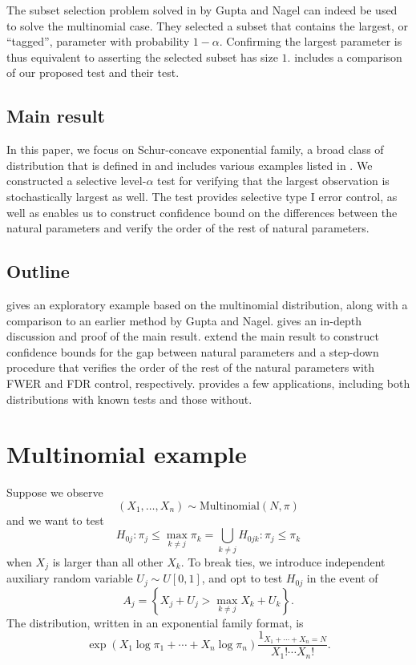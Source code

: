 \documentclass[11pt]{article}
\begin{document}
The subset selection problem solved in \cite{Gupta:1967wg} by Gupta and Nagel can indeed be used to solve the multinomial case. They selected a subset that contains the largest, or ``tagged'', parameter with probability $1-\alpha$. Confirming the largest parameter is thus equivalent to asserting the selected subset has size $1$.  includes a comparison of our proposed test and their test.

\subsection{Main result}

In this paper, we focus on Schur-concave exponential family, a broad class of distribution that is defined in  and includes various examples listed in . We constructed a selective level-$\alpha$ test for verifying that the largest observation is stochastically largest as well. The test provides selective type I error control, as well as enables us to construct confidence bound on the differences between the natural parameters and verify the order of the rest of natural parameters.

\subsection{Outline}

 gives an exploratory example based on the multinomial distribution, along with a comparison to an earlier method by Gupta and Nagel.  gives an in-depth discussion and proof of the main result.  extend the main result to construct confidence bounds for the gap between natural parameters and a step-down procedure that verifies the order of the rest of the natural parameters with FWER and FDR control, respectively.  provides a few applications, including both distributions with known tests and those without.

\section{Multinomial example}
\label{sec:multinomial_example}

Suppose we observe
$$\left(X_1, \ldots, X_n\right) \sim \text{Multinomial}\left(N, \pi\right)$$
and we want to test
$$H_{0j}: \pi_j \le \max_{k \ne j} \pi_k = \bigcup_{k \ne j} H_{0jk}: \pi_j \le \pi_k$$
when $X_j$ is larger than all other $X_k$. To break ties, we introduce independent auxiliary random variable $U_j \sim U\left[0,1\right]$, and opt to test $H_{0j}$ in the event of
$$A_j = \left\{X_j + U_j > \max_{k \ne j} X_k + U_k\right\}.$$
The distribution, written in an exponential family format, is
$$\exp\left(X_1 \log \pi_1 + \cdots + X_n \log \pi_n\right) \frac{1_{X_1 + \cdots + X_n = N}}{X_1! \cdots X_n!}.$$
\end{document}
